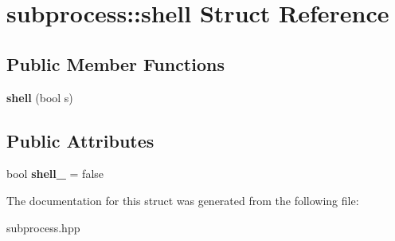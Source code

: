 \hypertarget{structsubprocess_1_1shell}{}\section{subprocess\+:\+:shell Struct Reference}
\label{structsubprocess_1_1shell}
\subsection*{Public Member Functions}
\begin{DoxyCompactItemize}
\item 
\mbox{\label{structsubprocess_1_1shell_a3e27f8a67ed269294f378ee60aff5153}} 
{\bfseries shell} (bool s)
\end{DoxyCompactItemize}
\subsection*{Public Attributes}
\begin{DoxyCompactItemize}
\item 
\mbox{\label{structsubprocess_1_1shell_a5b1473441561252063fa619a08023658}} 
bool {\bfseries shell\+\_\+} = false
\end{DoxyCompactItemize}


The documentation for this struct was generated from the following file\+:\begin{DoxyCompactItemize}
\item 
subprocess.\+hpp\end{DoxyCompactItemize}
